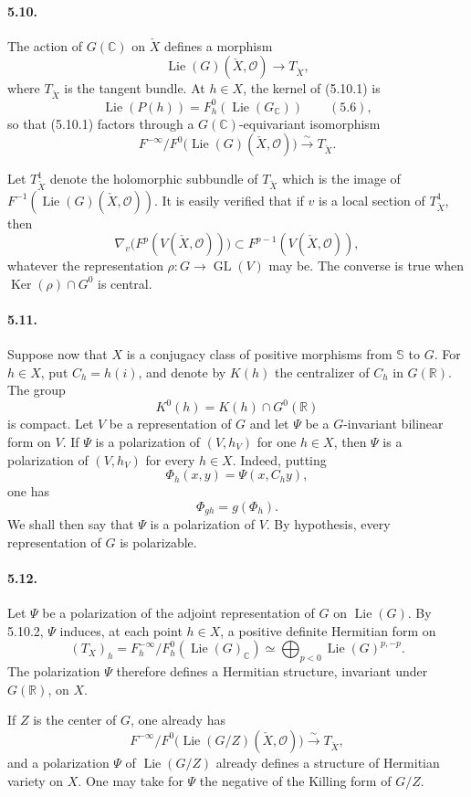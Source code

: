 \documentclass[10pt]{article}
\newcommand{\C}{\mathbb C}
\newcommand{\R}{\mathbb R}
\newcommand{\bS}{\mathbb S}
\newcommand{\cO}{\mathcal O}
\newcommand{\Ker}{\operatorname{Ker}}
\theoremstyle{deligne}
\newcommand{\Lie}{\operatorname{Lie}}
\newcommand{\GL}{\operatorname{GL}}
\begin{document}
\paragraph{5.10.}
The action of $G(\C)$ on $\check X$ defines a morphism
\[
\tag{5.10.1}
  \Lie(G)(\check X,\cO)\longrightarrow T_{\check X},
\]
where $T_{\check X}$ is the tangent bundle. At $h\in X$, the kernel of (5.10.1) is
\[
  \Lie(P(h))=F_h^0(\Lie(G_\C)) \qquad (5.6),
\]
so that (5.10.1) factors through a $G(\C)$-equivariant isomorphism
\[
\tag{5.10.2}
  F^{-\infty}/F^0\bigl(\Lie(G)(\check X,\cO)\bigr)
  \xrightarrow{\sim} T_{\check X}.
\]

Let $T^1_{\check X}$ denote the holomorphic subbundle of $T_{\check X}$ which is the image of $F^{-1}(\Lie(G)(\check X,\cO))$. It is easily verified that if $v$ is a local section of $T^1_{\check X}$, then
\[
  \nabla_v\bigl(F^p(V(\check X,\cO))\bigr)
  \subset F^{p-1}(V(\check X,\cO)),
\]
whatever the representation $\rho:G\to\GL(V)$ may be. The converse is true when $\Ker(\rho)\cap G^0$ is central.

\paragraph{5.11.}
Suppose now that $X$ is a conjugacy class of positive morphisms from $\bS$ to $G$. For $h\in X$, put $C_h=h(i)$, and denote by $K(h)$ the centralizer of $C_h$ in $G(\R)$. The group
\[
  K^0(h)=K(h)\cap G^0(\R)
\]
is compact. Let $V$ be a representation of $G$ and let $\Psi$ be a $G$-invariant bilinear form on $V$. If $\Psi$ is a polarization of $(V,h_V)$ for one $h\in X$, then $\Psi$ is a polarization of $(V,h_V)$ for every $h\in X$. Indeed, putting
\[
  \Phi_h(x,y)=\Psi(x,C_hy),
\]
one has
\[
\tag{5.11.1}
  \Phi_{gh}=g(\Phi_h).
\]
We shall then say that $\Psi$ is a polarization of $V$. By hypothesis, every representation of $G$ is polarizable.

\paragraph{5.12.}
Let $\Psi$ be a polarization of the adjoint representation of $G$ on $\Lie(G)$. By 5.10.2, $\Psi$ induces, at each point $h\in X$, a positive definite Hermitian form on
\[
\tag{5.12.1}
  (T_X)_h
  =
  F_h^{-\infty}/F_h^0(\Lie(G)_\C)
  \simeq
  \bigoplus_{p<0}\Lie(G)^{p,-p}.
\]
The polarization $\Psi$ therefore defines a Hermitian structure, invariant under $G(\R)$, on $X$.

If $Z$ is the center of $G$, one already has
\[
\tag{5.12.2}
  F^{-\infty}/F^0\bigl(\Lie(G/Z)(\check X,\cO)\bigr)
  \xrightarrow{\sim} T_{\check X},
\]
and a polarization $\Psi$ of $\Lie(G/Z)$ already defines a structure of Hermitian variety on $X$. One may take for $\Psi$ the negative of the Killing form of $G/Z$.
\end{document}

